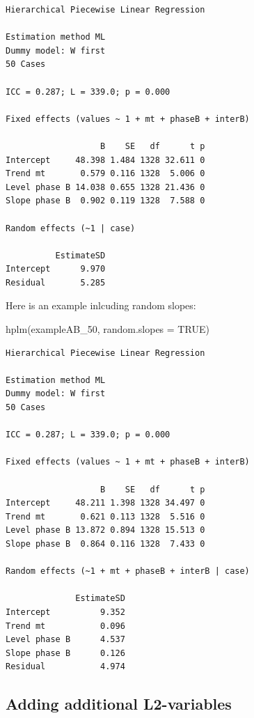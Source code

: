 \documentclass[
  letterpaper,
  DIV=11,
  numbers=noendperiod]{scrreprt}
\newenvironment{Shaded}{\begin{snugshade}}{\end{snugshade}}
\newcommand{\AttributeTok}[1]{\textcolor[rgb]{0.40,0.45,0.13}{#1}}
\newcommand{\ConstantTok}[1]{\textcolor[rgb]{0.56,0.35,0.01}{#1}}
\newcommand{\FunctionTok}[1]{\textcolor[rgb]{0.28,0.35,0.67}{#1}}
\newcommand{\NormalTok}[1]{\textcolor[rgb]{0.00,0.23,0.31}{#1}}
\begin{document}
\begin{verbatim}
Hierarchical Piecewise Linear Regression

Estimation method ML 
Dummy model: W first
50 Cases

ICC = 0.287; L = 339.0; p = 0.000

Fixed effects (values ~ 1 + mt + phaseB + interB)

                   B    SE   df      t p
Intercept     48.398 1.484 1328 32.611 0
Trend mt       0.579 0.116 1328  5.006 0
Level phase B 14.038 0.655 1328 21.436 0
Slope phase B  0.902 0.119 1328  7.588 0

Random effects (~1 | case)

          EstimateSD
Intercept      9.970
Residual       5.285
\end{verbatim}

Here is an example inlcuding random slopes:

\begin{Shaded}
\begin{Highlighting}[]
\FunctionTok{hplm}\NormalTok{(exampleAB\_50, }\AttributeTok{random.slopes =} \ConstantTok{TRUE}\NormalTok{)}
\end{Highlighting}
\end{Shaded}

\begin{verbatim}
Hierarchical Piecewise Linear Regression

Estimation method ML 
Dummy model: W first
50 Cases

ICC = 0.287; L = 339.0; p = 0.000

Fixed effects (values ~ 1 + mt + phaseB + interB)

                   B    SE   df      t p
Intercept     48.211 1.398 1328 34.497 0
Trend mt       0.621 0.113 1328  5.516 0
Level phase B 13.872 0.894 1328 15.513 0
Slope phase B  0.864 0.116 1328  7.433 0

Random effects (~1 + mt + phaseB + interB | case)

              EstimateSD
Intercept          9.352
Trend mt           0.096
Level phase B      4.537
Slope phase B      0.126
Residual           4.974
\end{verbatim}

\hypertarget{sec-add-l2}{%
\subsection{Adding additional L2-variables}\label{sec-add-l2}}
\end{document}
